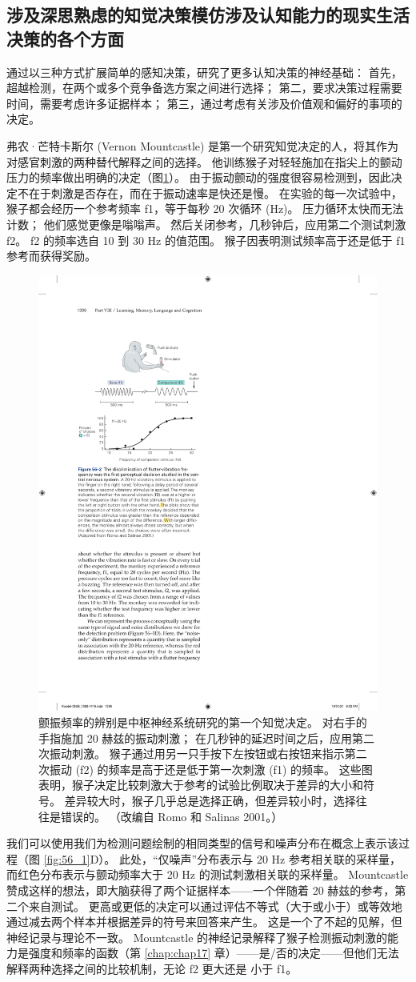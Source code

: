 \subsection{涉及深思熟虑的知觉决策模仿涉及认知能力的现实生活决策的各个方面}

通过以三种方式扩展简单的感知决策，研究了更多认知决策的神经基础：
首先，超越检测，在两个或多个竞争备选方案之间进行选择；
第二，要求决策过程需要时间，需要考虑许多证据样本； 第三，通过考虑有关涉及价值观和偏好的事项的决定。


弗农·芒特卡斯尔 (Vernon Mountcastle) 是第一个研究知觉决定的人，将其作为对感官刺激的两种替代解释之间的选择。
他训练猴子对轻轻施加在指尖上的颤动压力的频率做出明确的决定（图\ref{fig:56_2}）。
由于振动颤动的强度很容易检测到，因此决定不在于刺激是否存在，而在于振动速率是快还是慢。
在实验的每一次试验中，猴子都会经历一个参考频率 f1，等于每秒 20 次循环 (Hz)。
压力循环太快而无法计数； 他们感觉更像是嗡嗡声。
然后关闭参考，几秒钟后，应用第二个测试刺激 f2。
f2 的频率选自 10 到 30 Hz 的值范围。
猴子因表明测试频率高于还是低于 f1 参考而获得奖励。


\begin{figure}[htbp]
	\centering
	\includegraphics[width=0.5\linewidth]{chap56/fig_56_2}
	\caption{颤振频率的辨别是中枢神经系统研究的第一个知觉决定。 对右手的手指施加 20 赫兹的振动刺激； 在几秒钟的延迟时间之后，应用第二次振动刺激。 猴子通过用另一只手按下左按钮或右按钮来指示第二次振动 (f2) 的频率是高于还是低于第一次刺激 (f1) 的频率。 这些图表明，猴子决定比较刺激大于参考的试验比例取决于差异的大小和符号。 差异较大时，猴子几乎总是选择正确，但差异较小时，选择往往是错误的。 （改编自 Romo 和 Salinas 2001。）}
	\label{fig:56_2}
\end{figure}


我们可以使用我们为检测问题绘制的相同类型的信号和噪声分布在概念上表示该过程（图 \ref{fig:56_1}D）。
此处，“仅噪声”分布表示与 20 Hz 参考相关联的采样量，而红色分布表示与颤动频率大于 20 Hz 的测试刺激相关联的采样量。
Mountcastle 赞成这样的想法，即大脑获得了两个证据样本——一个伴随着 20 赫兹的参考，第二个来自测试。
更高或更低的决定可以通过评估不等式（大于或小于）或等效地通过减去两个样本并根据差异的符号来回答来产生。
这是一个了不起的见解，但神经记录与理论不一致。 Mountcastle 的神经记录解释了猴子检测振动刺激的能力是强度和频率的函数（第 \ref{chap:chap17} 章）——是/否的决定——但他们无法解释两种选择之间的比较机制，无论 f2 更大还是 小于 f1。


